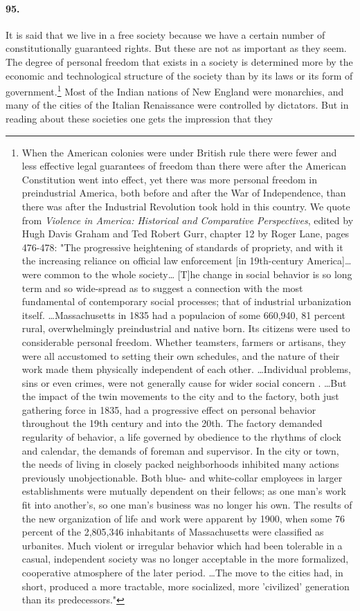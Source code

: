 \documentclass[12pt]{book}
\begin{document}
\paragraph{95.}  It is said that we live in a free society because we have a certain number of constitutionally guaranteed rights. But these are not as important as they seem. The degree of personal freedom that exists in a society is determined more by the economic and technological structure of the society than by its laws or its form of government.\footnote{When the American colonies were under British rule there were fewer and less effective legal guarantees of freedom than there were after the American Constitution went into effect, yet there was more personal freedom in preindustrial America, both before and after the War of Independence, than there was after the Industrial Revolution took hold in this country. We quote from \emph{Violence in America: Historical and Comparative Perspectives}, edited by Hugh Davis Graham and Ted Robert Gurr, chapter 12 by Roger Lane, pages 476-478: "The progressive heightening of standards of propriety, and with it the increasing reliance on official law enforcement [in 19th-century America]\dots{}were common to the whole society\dots{} [T]he change in social behavior is so long term and so wide-spread as to suggest a connection with the most fundamental of contemporary social processes; that of industrial urbanization itself. \dots{}Massachusetts in 1835 had a populacion of some 660,940, 81 percent rural, overwhelmingly preindustrial and native born. Its citizens were used to considerable personal freedom. Whether teamsters, farmers or artisans, they were all accustomed to setting their own schedules, and the nature of their work made them physically independent of each other. \dots{}Individual problems, sins or even crimes, were not generally cause for wider social concern . \dots{}But the impact of the twin movements to the city and to the factory, both just gathering force in 1835, had a progressive effect on personal behavior throughout the 19th century and into the 20th. The factory demanded regularity of behavior, a life governed by obedience to the rhythms of clock and calendar, the demands of foreman and supervisor. In the city or town, the needs of living in closely packed neighborhoods inhibited many actions previously unobjectionable. Both blue- and white-collar employees in larger establishments were mutually dependent on their fellows; as one man's work fit into another's, so one man's business was no longer his own. The results of the new organization of life and work were apparent by 1900, when some 76 percent of the 2,805,346 inhabitants of Massachusetts were classified as urbanites. Much violent or irregular behavior which had been tolerable in a casual, independent society was no longer acceptable in the more formalized, cooperative atmosphere of the later period. \dots{}The move to the cities had, in short, produced a more tractable, more socialized, more 'civilized' generation than its predecessors."} Most of the Indian nations of New England were monarchies, and many of the cities of the Italian Renaissance were controlled by dictators. But in reading about these societies one gets the impression that they 
\end{document}
